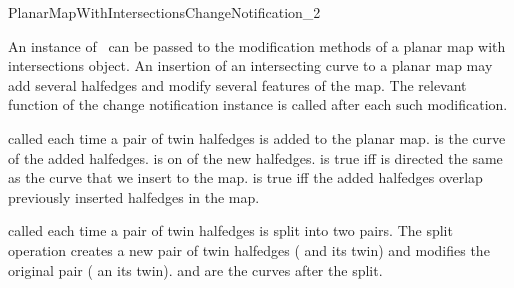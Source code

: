 
\ccRefPageBegin

\begin{ccRefConcept}{PlanarMapWithIntersectionsChangeNotification_2}

\ccDefinition
   An instance of \ccRefName\ can be passed to the modification
   methods of a planar map with intersections object. An insertion
   of an intersecting curve to a planar map may add several
   halfedges and modify several features of the map. The relevant
   function of the change notification instance is called after
   each such modification.

\ccTypes
{}


  {called each time a pair of twin halfedges is added to the planar map.
   is the curve of the added halfedges.
   is on of the new halfedges.
   is true iff  is directed the same as the curve that we insert to the map.
   is true iff the added halfedges overlap previously inserted halfedges in the map.}

  {called each time a pair of twin halfedges is split into two
  pairs. The split operation creates a new pair of twin halfedges
  ( and its twin) and modifies the original
  pair ( an its twin).
   and  are the curves after the split.
  }


\end{ccRefConcept}
